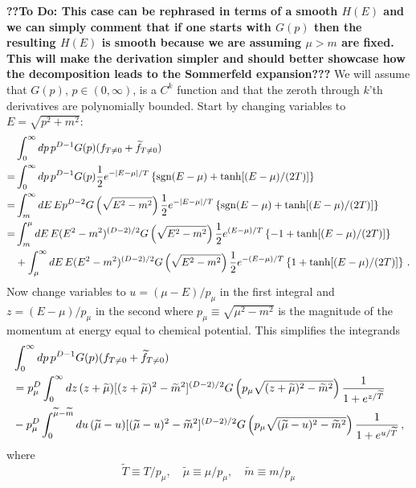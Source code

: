 \documentclass[sn-mathphys,Numbered]{sn-jnl}
\begin{document}
{\bf ??To Do: This case can be rephrased in terms of a smooth $H(E)$ and we can simply comment that if one starts with $G(p)$ then the resulting $H(E)$ is smooth because we are assuming $\mu>m$ are fixed. This will make the derivation simpler and should better showcase how the decomposition leads to the Sommerfeld expansion???}
We will assume that $G(p)$, $p\in(0,\infty)$, is a $C^k$ function and that the zeroth through $k$'th derivatives are polynomially bounded.
Start by changing variables to $E=\sqrt{p^2+m^2}$:
\begin{align}
    &\int_0^\infty dp\, p^{D-1} G(p)(f_{T\neq 0}+\widetilde{f}_{T\neq 0})\\
=&\int_0^\infty dp\, p^{D-1} G(p)\frac{1}{2}e^{-|E-\mu|/T}\left\{\mathrm{sgn}(E-\mu)+\tanh[(E-\mu)/(2T)]\right\}\notag\\
    =&\int_m^\infty dE \,Ep^{D-2} G\left(\sqrt{E^2-m^2}\right)\frac{1}{2}e^{-|E-\mu|/T}\left\{\mathrm{sgn}(E-\mu)+\tanh[(E-\mu)/(2T)]\right\}\notag\\
    =&\int_m^{\mu} dE \,E(E^2-m^2)^{(D-2)/2} G\left(\sqrt{E^2-m^2}\right)\frac{1}{2}e^{(E-\mu)/T}\left\{-1+\tanh[(E-\mu)/(2T)]\right\}\notag\\
    &+\int_{\mu}^\infty dE\, E(E^2-m^2)^{(D-2)/2} G\left(\sqrt{E^2-m^2}\right)\frac{1}{2}e^{-(E-\mu)/T}\left\{1+\tanh[(E-\mu)/(2T)]\right\}\,.\notag
\end{align}
Now change variables to $u=(\mu-E)/p_\mu$ in the first integral and $z=(E-\mu)/p_\mu$ in the second where $p_{\mu} \equiv \sqrt{\mu^2 - m^2}$ is the magnitude of the momentum at energy equal to chemical potential. This simplifies the integrands 
\begin{align}
    &\int_0^\infty dp\, p^{D-1} G(p)(f_{T\neq 0}+\widetilde{f}_{T\neq 0})\\
        &=p_\mu^D \int_0^\infty dz\, (z+\widetilde{\mu})[(z+\widetilde{\mu})^2-\widetilde{m}^2]^{(D-2)/2} G\left(p_\mu \sqrt{(z+\widetilde{\mu})^2-\widetilde{m}^2}\right)\frac{1}{1+e^{z/\widetilde{T}}}\notag\\
        &-p_\mu^D \int_0^{\widetilde{\mu}-\widetilde{m}} du\, (\widetilde{\mu}-u)[(\widetilde{\mu}-u)^2-\widetilde{m}^2]^{(D-2)/2} G\left(p_\mu \sqrt{(\widetilde{\mu}-u)^2-\widetilde{m}^2}\right)\frac{1}{1+e^{u/\widetilde{T}}}\,,\notag
\end{align}
where 
\begin{equation}
\widetilde{T} \equiv T/p_\mu, \quad \widetilde{\mu} \equiv \mu/p_\mu, \quad  \widetilde{m} \equiv m/p_\mu     
\end{equation}
\end{document}

